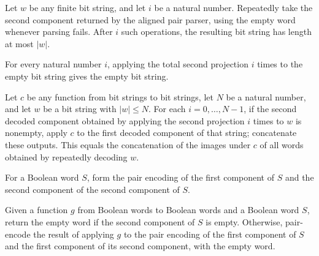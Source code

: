 \begin{theorem}
\label{Complexity.BinArith.length_iterate_pairSndD_le}
\leanok
{}
Let $w$ be any finite bit string, and let $i$ be a natural number. Repeatedly take the
second component returned by the aligned pair parser, using the empty word whenever
parsing fails. After $i$ such operations, the resulting bit string has length at most
$|w|$.
\end{theorem}

\begin{theorem}
\label{Complexity.BinArith.iterate_pairSndD_nil}
\leanok
{}
For every natural number $i$, applying the total second projection $i$ times to the
empty bit string gives the empty bit string.
\end{theorem}

\begin{theorem}
\label{Complexity.BinArith.flatMap_listLoop}
\leanok
{}
Let $c$ be any function from bit strings to bit strings, let $N$ be a natural number,
and let $w$ be a bit string with $|w|\le N$. For each $i=0,\ldots,N-1$, if the second
decoded component obtained by applying the second projection $i$ times to $w$ is
nonempty, apply $c$ to the first decoded component of that string; concatenate these
outputs. This equals the concatenation of the images under $c$ of all words obtained by
repeatedly decoding $w$.
\end{theorem}

\begin{definition}
\label{Complexity.BinArith.listStep}
\leanok
{}
For a Boolean word $S$, form the pair encoding of the first component of $S$ and the
second component of the second component of $S$.
\end{definition}

\begin{definition}
\label{Complexity.BinArith.mapChunk}
\leanok
{}
Given a function $g$ from Boolean words to Boolean words and a Boolean word $S$, return
the empty word if the second component of $S$ is empty. Otherwise, pair-encode the
result of applying $g$ to the pair encoding of the first component of $S$ and the first
component of its second component, with the empty word.
\end{definition}

